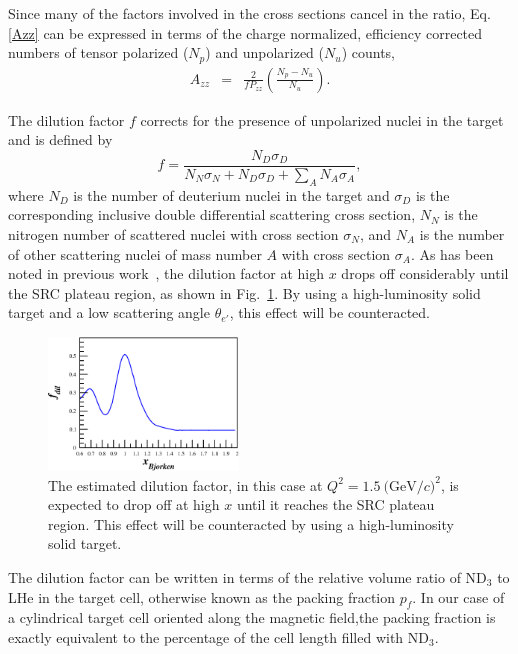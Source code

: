 Since many of the factors involved in the cross sections cancel in
the ratio, Eq. \ref{Azz} can be expressed in terms 
of the charge normalized, efficiency corrected numbers of tensor polarized ($N_p$) and unpolarized ($N_u$) counts, 
\begin{eqnarray} \label{3}
A_{zz}&=&\frac{2}{fP_{zz}}\left(\frac{N_p - N_u}{N_u}\right) .
\end{eqnarray}

The dilution factor $f$ corrects for the presence of unpolarized nuclei in the target and is defined by
\begin{equation}
f=\frac{N_D\sigma_D}{N_N\sigma_N+N_D\sigma_D+\sum\limits_{A} N_A\sigma_A},
\end{equation}
where $N_D$ is the number of deuterium nuclei in the target and $\sigma_D$ is the corresponding inclusive double differential scattering cross 
section, $N_N$ is the nitrogen number of scattered nuclei with cross section $\sigma_N$, and $N_A$ is the number of other scattering nuclei of mass number $A$ with cross section $\sigma_A$. As has been noted in previous work~\cite{Frankfurt:1988nt}, the dilution factor at high $x$ drops off considerably until the SRC plateau region, as shown in Fig.~\ref{fdil}. By using a high-luminosity solid target and a low scattering angle $\theta_{e'}$, this effect will be counteracted.

\begin{figure}
\begin{center}
\includegraphics[width=0.45\textwidth]{figs/fdil_q2_15.eps}
\caption{\label{fdil}The estimated dilution factor, in this case at $Q^2=1.5 \mathrm{~(GeV}/c)^2$, is expected to drop off at high $x$ until it reaches the SRC plateau region. This effect will be counteracted by using a high-luminosity solid target.}
\end{center}
\end{figure}

The dilution factor can be written in terms of the relative volume ratio of ND$_3$ to LHe in the target cell, otherwise known as the packing fraction $p_f$.  
In our case of a cylindrical target cell oriented along the magnetic field,the packing fraction is exactly equivalent to the percentage of the cell length filled with ND$_3$.  

